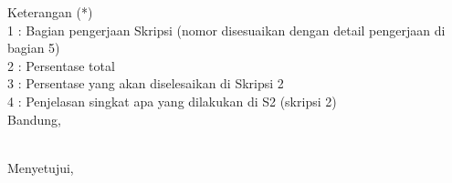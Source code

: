 \documentclass[a4paper,twoside]{article}
\begin{document}
Keterangan (*)\\
1 : Bagian pengerjaan Skripsi (nomor disesuaikan dengan detail pengerjaan di bagian 5)\\
2 : Persentase total \\
3 : Persentase yang akan diselesaikan di Skripsi 2 \\
4 : Penjelasan singkat apa yang dilakukan di S2 (skripsi 2) \\

\vspace{1cm}
\centering Bandung, \tanggal\\
\vspace{2cm} \nama \\ 
\vspace{1cm}

Menyetujui, \\
\end{document}
